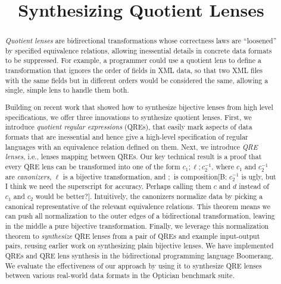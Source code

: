 \documentclass[acmsmall,review,anonymous]{acmart}
\newcommand{\FINISH}[3]{\ifdraft\textcolor{#1}{[#2: #3]}\fi}
\newcommand{\bcp}[1]{\FINISH{dkred}{B}{#1}}
\begin{document}
\title{Synthesizing Quotient Lenses}
\begin{abstract}
{\em Quotient lenses} are bidirectional transformations whose correctness
laws are ``loosened'' by specified equivalence relations, allowing
inessential details in concrete data formats to be suppressed. 
For example, a programmer could use a quotient lens to define 
a transformation that ignores the order of fields in XML data, so
that two XML files with the same fields but in different orders would be
considered the same, allowing a single, simple lens to handle them both. 

Building on recent work that showed how to synthesize bijective lenses from high
level specifications, we offer three innovations to synthesize quotient lenses.
First, we introduce {\em quotient regular expressions} (QREs), that easily mark
aspects of data formats that are inessential and hence give a high-level
specification of regular languages with an equivalence relation defined on
them. Next, we introduce {\em QRE lenses}, i.e., lenses mapping between QREs.
Our key technical result is a proof that every QRE lens can be transformed into
one of the form $c_1 ; \ell ; c_2^{-1}$, where $c_1$ and $c_2^{-1}$ are {\em
canonizers}, $\ell$ is a bijective transformation, and $;$ is
composition\iflastminute\bcp{$c_2^{-1}$ is ugly, but I think we need the
superscript for accuracy.  Perhaps calling them $c$ and $d$ instead of $c_1$
and $c_2$ would be better?}\fi.  Intuitively, the canonizers normalize data by
picking a canonical representative of the relevant equivalence relations. This
theorem means we can push all normalization to the outer edges of a
bidirectional transformation, leaving in the middle a pure bijective
transformation. Finally, we leverage this normalization theorem to {\em
synthesize} QRE lenses from a pair of QREs and example input-output pairs,
reusing earlier work on synthesizing plain bijective lenses. We have
implemented QREs and QRE lens synthesis in the bidirectional programming
language Boomerang. We evaluate the effectiveness of our approach by using it
to synthesize QRE lenses between various real-world data formats in the
Optician benchmark suite.

\end{abstract}

\maketitle
\end{document}
